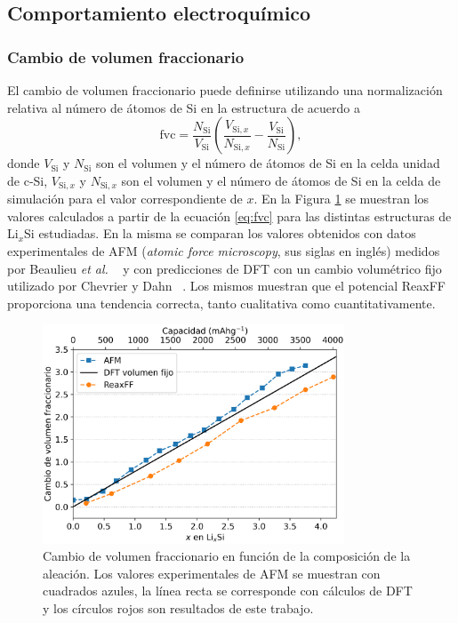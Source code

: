 \subsection{Comportamiento electroquímico}

\subsubsection{Cambio de volumen fraccionario}

El cambio de volumen fraccionario puede definirse utilizando una normalización 
relativa al número de átomos de Si en la estructura de acuerdo a
\begin{equation}\label{eq:fvc}
    \text{fvc} = \frac{N_{\text{Si}}}{V_{\text{Si}}} \left( \frac{V_{\text{Si},x}}{N_{\text{Si},x}} - \frac{V_{\text{Si}}}{N_{\text{Si}}} \right),
\end{equation}
donde $V_{\text{Si}}$ y $N_{\text{Si}}$ son el volumen y el número de átomos de 
Si en la celda unidad de c-Si, $V_{\text{Si},x}$ y $N_{\text{Si},x}$ son el 
volumen y el número de átomos de Si
en la celda de simulación para el valor correspondiente de $x$. En la Figura
\ref{fig:fvc} se muestran los valores calculados a partir de la ecuación 
\ref{eq:fvc} para las distintas estructuras de Li$_x$Si estudiadas. En la misma 
se comparan los valores obtenidos con datos experimentales de AFM (\textit{atomic 
force microscopy}, sus siglas en inglés) medidos por Beaulieu \textit{et al.} 
~\cite{beaulieu2003} y con predicciones de DFT con un cambio volumétrico fijo 
utilizado por Chevrier y Dahn ~\cite{chevrier2009}. Los mismos muestran que el
potencial ReaxFF proporciona una tendencia correcta, tanto cualitativa como 
cuantitativamente.
\begin{figure}[h]
    \centering
    \includegraphics[width=0.8\textwidth]{Silicio/caracterizacion/resultados/electroquimica/fvc.png}
    \caption{Cambio de volumen fraccionario en función de la composición de la 
    aleación. Los valores experimentales de AFM se muestran con cuadrados azules, 
    la línea recta se corresponde con cálculos de DFT y los círculos rojos son 
    resultados de este trabajo.}
    \label{fig:fvc}
\end{figure}

